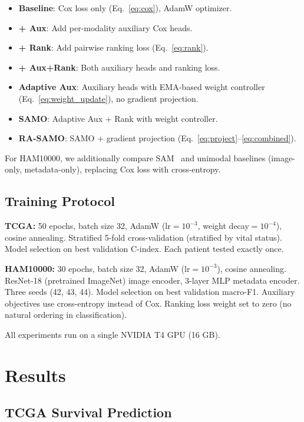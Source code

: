 \documentclass[10pt,twocolumn]{article}
\begin{document}
\begin{itemize}
\item \textbf{Baseline}: Cox loss only (Eq.~\ref{eq:cox}), AdamW optimizer.
\item \textbf{+ Aux}: Add per-modality auxiliary Cox heads.
\item \textbf{+ Rank}: Add pairwise ranking loss (Eq.~\ref{eq:rank}).
\item \textbf{+ Aux+Rank}: Both auxiliary heads and ranking loss.
\item \textbf{Adaptive Aux}: Auxiliary heads with EMA-based weight
controller (Eq.~\ref{eq:weight_update}), no gradient projection.
\item \textbf{SAMO}: Adaptive Aux + Rank with weight controller.
\item \textbf{RA-SAMO}: SAMO + gradient projection
(Eq.~\ref{eq:project}--\ref{eq:combined}).
\end{itemize}

For HAM10000, we additionally compare SAM~\cite{foret2021sam} and
unimodal baselines (image-only, metadata-only), replacing Cox loss
with cross-entropy.

\subsection{Training Protocol}

\textbf{TCGA:} 50 epochs, batch size 32, AdamW (lr$\!=\!10^{-3}$,
weight decay$\!=\!10^{-4}$), cosine annealing. Stratified 5-fold
cross-validation (stratified by vital status). Model selection on
best validation C-index. Each patient tested exactly once.

\textbf{HAM10000:} 30 epochs, batch size 32, AdamW
(lr$\!=\!10^{-3}$), cosine annealing. ResNet-18 (pretrained
ImageNet) image encoder, 3-layer MLP metadata encoder. Three seeds
(42, 43, 44). Model selection on best validation macro-F1. Auxiliary
objectives use cross-entropy instead of Cox. Ranking loss weight
set to zero (no natural ordering in classification).

All experiments run on a single NVIDIA T4 GPU (16 GB).


\section{Results}

\subsection{TCGA Survival Prediction}
\end{document}
